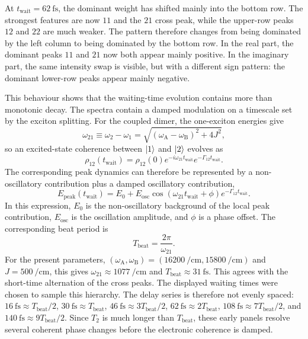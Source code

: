 At \(t_{\mathrm{wait}}=\SI{62}{\femto\second}\), the dominant weight has shifted mainly into the bottom row. The strongest features are now $11$ and the $21$ cross peak, while the upper-row peaks $12$ and $22$ are much weaker. The pattern therefore changes from being dominated by the left column to being dominated by the bottom row. In the real part, the dominant peaks $11$ and $21$ now both appear mainly positive. In the imaginary part, the same intensity swap is visible, but with a different sign pattern: the dominant lower-row peaks appear mainly negative.

This behaviour shows that the waiting-time evolution contains more than monotonic decay. The spectra contain a damped modulation on a timescale set by the exciton splitting. For the coupled dimer, the one-exciton energies give
\begin{equation*}
\omega_{21} \equiv \omega_2-\omega_1 = \sqrt{(\omega_{\mathrm{A}}-\omega_{\mathrm{B}})^2+4J^2},
\end{equation*}
so an excited-state coherence between \(\ket{1}\) and \(\ket{2}\) evolves as~\cite{mancal2022nonlinearopticalspectroscopy}
\begin{equation*}
\rho_{12}(t_{\mathrm{wait}})=\rho_{12}(0)e^{-i\omega_{21}t_{\mathrm{wait}}}e^{-\Gamma_{12}t_{\mathrm{wait}}}.
\end{equation*}
The corresponding peak dynamics can therefore be represented by a
non-oscillatory contribution plus a damped oscillatory contribution,
\begin{equation*}
E_{\mathrm{peak}}(t_{\mathrm{wait}})=E_{0}+E_{\mathrm{osc}}\cos(\omega_{21}t_{\mathrm{wait}}+\phi)e^{-\Gamma_{12}t_{\mathrm{wait}}}.
\end{equation*}
In this expression, \(E_{0}\) is the non-oscillatory background of the local peak contribution, \(E_{\mathrm{osc}}\) is the oscillation amplitude, and \(\phi\) is a phase offset. The corresponding beat period is
\begin{equation*}
T_{\mathrm{beat}}=\frac{2\pi}{\omega_{21}}.
\end{equation*}
For the present parameters,
\((\omega_{\mathrm{A}},\omega_{\mathrm{B}})=(\SI{16200}{\per\centi\metre},\SI{15800}{\per\centi\metre})\)
and \(J=\SI{500}{\per\centi\metre}\), this gives
\(\omega_{21}\approx\SI{1077}{\per\centi\metre}\) and
\(T_{\mathrm{beat}}\approx\SI{31}{\femto\second}\). This agrees with the
short-time alternation of the cross peaks. The displayed waiting times were
chosen to sample this hierarchy. The delay series is therefore not evenly spaced:
\(\SI{16}{\femto\second}\approx T_{\mathrm{beat}}/2\),
\(\SI{30}{\femto\second}\approx T_{\mathrm{beat}}\),
\(\SI{46}{\femto\second}\approx 3T_{\mathrm{beat}}/2\),
\(\SI{62}{\femto\second}\approx 2T_{\mathrm{beat}}\),
\(\SI{108}{\femto\second}\approx 7T_{\mathrm{beat}}/2\), and
\(\SI{140}{\femto\second}\approx 9T_{\mathrm{beat}}/2\). Since \(T_{2}\) is
much longer than \(T_{\mathrm{beat}}\), these early panels resolve several
coherent phase changes before the electronic coherence is damped.

